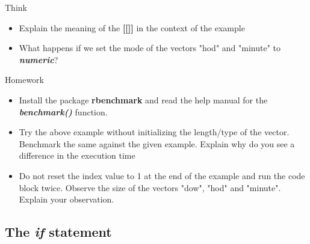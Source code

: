 \documentclass[12pt]{book}\usepackage{knitr}
\begin{document}
\begin{DIY}{Think}
\begin{itemize}
  \item \noindent Explain the meaning of the \textbf{[[]]} in the context of the example
  \item \noindent What happens if we set the mode of the vectors "hod" and "minute" to \textbf{\emph{numeric}}?
\end{itemize}
\end{DIY}

\begin{DIY}{Homework}
 \begin{itemize}
  \item \noindent Install the package \textbf{rbenchmark} and read the help manual for the \textbf{\emph{benchmark()}} function.
  \item \noindent Try the above example without initializing the length/type of the vector. Benchmark the same against the given example. Explain why do you see a difference in the execution time
  \item \noindent Do not reset the index value to 1 at the end of the example and run the code block twice. Observe the size of the vectors "dow", "hod" and "minute". Explain your observation.  
\end{itemize}
\end{DIY}

\subsection{The \textbf{\emph{if}} statement}
\label{sec: conditionalStatements}
\begin{HIGHLIGHT}
\par{}
\end{HIGHLIGHT}
\end{document}

